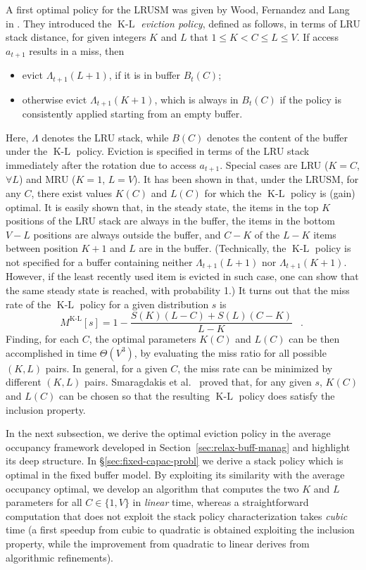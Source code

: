 \documentclass[11pt,a4paper]{article}
\DeclareMathOperator{\kl}{K-L}
\DeclareMathOperator{\mf}{\enspace .}
\theoremstyle{definition}
\theoremstyle{remark}
\begin{document}
A first optimal policy for the LRUSM was given by Wood, Fernandez and
Lang in \cite{WoodFL77,WoodFL83}. They introduced the
\emph{$\kl$ eviction policy}, defined as follows, in terms of LRU
stack distance, for given integers $K$ and $L$ that $1\leq K < C \leq
L \leq V$. If access $a_{t+1}$ results in a miss, then
\begin{itemize}
\item evict \(\Lambda_{t+1}(L+1)\), if it is in buffer $B_t(C)$;
\item otherwise evict \(\Lambda_{t+1}(K+1)\), which is always in
  $B_t(C)$ if the policy is consistently applied starting from an
  empty buffer.
\end{itemize}
Here, $\Lambda$ denotes the LRU stack, while $B(C)$ denotes the
content of the buffer under the $\kl$ policy.  Eviction is specified
in terms of the LRU stack immediately after the rotation due to access
$a_{t+1}$. Special cases are LRU ($K=C$, $\forall L$) and MRU ($K=1$,
$L=V$).  It has been shown in \cite{WoodFL77,WoodFL83} that, under the
LRUSM, for any $C$, there exist values $K(C)$ and $L(C)$ for which the
$\kl$ policy is (gain) optimal. It is easily shown that, in the steady
state, the items in the top $K$ positions of the LRU stack are always
in the buffer, the items in the bottom $V-L$ positions are always
outside the buffer, and $C-K$ of the $L-K$ items between position
$K+1$ and $L$ are in the buffer. (Technically, the $\kl$ policy is not
specified for a buffer containing neither \(\Lambda_{t+1}(L+1)\) nor
\(\Lambda_{t+1}(K+1)\). However, if the least recently used item is
evicted in such case, one can show that the same steady state is
reached, with probability 1.) It turns out that the miss rate of the
$\kl$ policy for a given distribution $s$ is
\begin{equation}
    M^{\kl}[s]= 1 - \frac{S(K)(L-C)+S(L)(C-K)}{L-K} \mf
\end{equation}
Finding, for each $C$, the optimal parameters $K(C)$ and $L(C)$ can be then
accomplished in time $\Theta(V^3)$, by evaluating the miss ratio for all
possible $(K,L)$ pairs.  In general, for a given $C$, the miss rate can be
minimized by different $(K,L)$ pairs. Smaragdakis et al.\
\cite{SmaragdakisKW99,SmaragdakisKW03} proved that, for any given $s$, $K(C)$
and $L(C)$ can be chosen so that the resulting $\kl$ policy does satisfy the
inclusion property.

In the next subsection, we derive the optimal eviction policy in the
average occupancy framework developed in
Section~\ref{sec:relax-buff-manag} and highlight its deep
structure. In \S\ref{sec:fixed-capac-probl} we derive a stack policy
which is optimal in the fixed buffer model. By exploiting its
similarity with the average occupancy optimal, we develop an algorithm
that computes the two $K$ and $L$ parameters for all $C \in \{1, V\}$
in \emph{linear} time, whereas a straightforward computation that does
not exploit the stack policy characterization takes \emph{cubic} time
(a first speedup from cubic to quadratic is obtained exploiting the
inclusion property, while the improvement from quadratic to linear
derives from algorithmic refinements).
\end{document}
